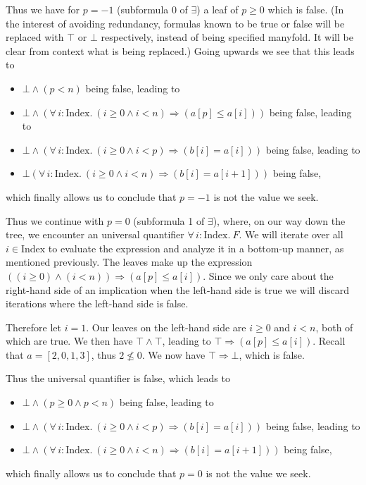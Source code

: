 \documentclass{article}
\begin{document}
Thus we have for $p = -1$ (subformula 0 of $\exists$) a leaf of $p \geq 0$ which is false. (In the interest of avoiding redundancy, formulas known to be true or false will be replaced with $\top$ or $\bot$ respectively, instead of being specified manyfold. It will be clear from context what is being replaced.) Going upwards we see that this leads to
\begin{itemize}
    \item $\bot \land (p < n)$ being false, leading to
    \item $\bot \land (\forall\, i:\text{Index.}\ (i \geq 0 \land i < n) \Rightarrow (a[p] \leq a[i]))$ being false, leading to
    \item $\bot \land (\forall\, i:\text{Index.}\ (i \geq 0 \land i < p) \Rightarrow (b[i] = a[i]))$ being false, leading to
    \item $\bot (\forall\, i:\text{Index.}\ (i \geq 0 \land i < n) \Rightarrow (b[i] = a[i + 1]))$ being false,
\end{itemize}
which finally allows us to conclude that $p = -1$ is not the value we seek.

Thus we continue with $p = 0$ (subformula 1 of $\exists$), where, on our way down the tree, we encounter an universal quantifier $\forall\, i:\text{Index.}\ F$. We will iterate over all $i \in \text{Index}$ to evaluate the expression and analyze it in a bottom-up manner, as mentioned previously. The leaves make up the expression $((i \geq 0) \land (i < n)) \Rightarrow (a[p] \leq a[i])$. Since we only care about the right-hand side of an implication when the left-hand side is true we will discard iterations where the left-hand side is false.

Therefore let $i = 1$. Our leaves on the left-hand side are $i \geq 0$ and $i < n$, both of which are true. We then have $\top \land \top$, leading to $\top \Rightarrow (a[p] \leq a[i])$. Recall that $a = [2, 0, 1, 3]$, thus $2 \nleq 0$. We now have $\top \Rightarrow \bot$, which is false.

Thus the universal quantifier is false, which leads to
\begin{itemize}
    \item $\bot \land (p \geq 0 \land p < n)$ being false, leading to
    \item $\bot \land (\forall\, i:\text{Index.}\ (i \geq 0 \land i < p) \Rightarrow (b[i] = a[i]))$ being false, leading to
    \item $\bot \land (\forall\, i:\text{Index.}\ (i \geq 0 \land i < n) \Rightarrow (b[i] = a[i + 1]))$ being false,
\end{itemize}
which finally allows us to conclude that $p = 0$ is not the value we seek.
\end{document}
